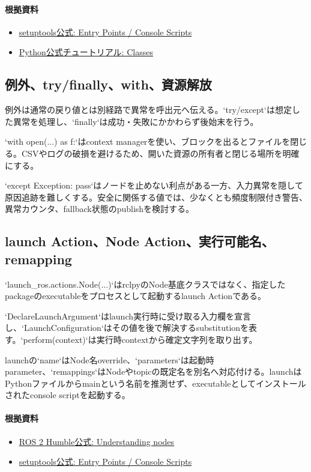 \documentclass[a4paper,11pt]{article}
\begin{document}
\paragraph{根拠資料}
\begin{itemize}[leftmargin=1.6em]
\item \href{https://setuptools.pypa.io/en/latest/userguide/entry_point.html}{setuptools公式: Entry Points / Console Scripts}
\item \href{https://docs.python.org/3/tutorial/classes.html}{Python公式チュートリアル: Classes}
\end{itemize}

\subsection{例外、try/finally、with、資源解放}
例外は通常の戻り値とは別経路で異常を呼出元へ伝える。`try/except`は想定した異常を処理し、`finally`は成功・失敗にかかわらず後始末を行う。


`with open(...) as f:`はcontext managerを使い、ブロックを出るとファイルを閉じる。CSVやログの破損を避けるため、開いた資源の所有者と閉じる場所を明確にする。


`except Exception: pass`はノードを止めない利点がある一方、入力異常を隠して原因追跡を難しくする。安全に関係する値では、少なくとも頻度制限付き警告、異常カウンタ、fallback状態のpublishを検討する。



\subsection{launch Action、Node Action、実行可能名、remapping}
`launch\_ros.actions.Node(...)`はrclpyのNode基底クラスではなく、指定したpackageのexecutableをプロセスとして起動するlaunch Actionである。


`DeclareLaunchArgument`はlaunch実行時に受け取る入力欄を宣言し、`LaunchConfiguration`はその値を後で解決するsubstitutionを表す。`perform(context)`は実行時contextから確定文字列を取り出す。


launchの`name`はNode名override、`parameters`は起動時parameter、`remappings`はNodeやtopicの既定名を別名へ対応付ける。launchはPythonファイルからmainという名前を推測せず、executableとしてインストールされたconsole scriptを起動する。

\paragraph{根拠資料}
\begin{itemize}[leftmargin=1.6em]
\item \href{https://docs.ros.org/en/humble/Tutorials/Beginner-CLI-Tools/Understanding-ROS2-Nodes/Understanding-ROS2-Nodes.html}{ROS 2 Humble公式: Understanding nodes}
\item \href{https://setuptools.pypa.io/en/latest/userguide/entry_point.html}{setuptools公式: Entry Points / Console Scripts}
\end{itemize}
\end{document}

